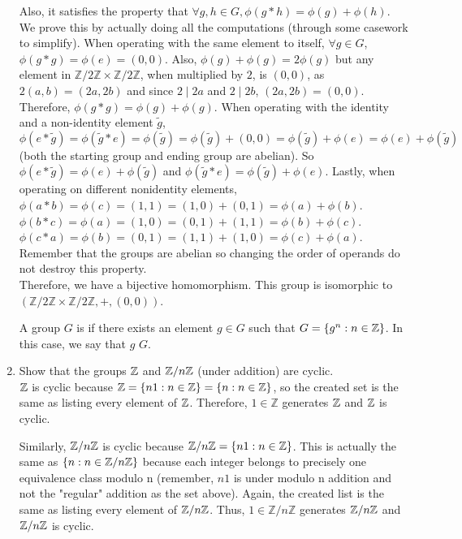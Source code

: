 \documentclass{amsart}
\begin{document}
\begin{enumerate}[itemsep=0.4in]
Also, it satisfies the property that $\forall g,h\in G,\phi(g*h)=\phi(g)+\phi(h)$. We prove this by actually doing all the computations (through some casework to simplify). 
When operating with the same element to itself, $\forall g\in G$, $\phi(g*g)=\phi(e)=(0,0)$. Also, $\phi(g)+\phi(g)=2\phi(g)$ but any element in $\mathbb{Z}/2\mathbb{Z}\times\mathbb{Z}/2\mathbb{Z}$, when multiplied by $2$, is $(0,0)$, as $2(a,b)=(2a,2b)$ and since $2\mid 2a$ and $2\mid 2b$, $(2a,2b)=(0,0)$. Therefore, $\phi(g*g)=\phi(g)+\phi(g)$. 
When operating with the identity and a non-identity element $\tilde g$, $$\phi(e*\tilde g)=\phi(\tilde g*e)=\phi(\tilde g)=\phi(\tilde g)+(0,0)=\phi(\tilde g)+\phi(e)=\phi(e)+\phi(\tilde g)$$ (both the starting group and ending group are abelian). So $\phi(e*\tilde g)=\phi(e)+\phi(\tilde g)$ and $\phi(\tilde{g}*e)=\phi(\tilde g)+\phi(e)$.
Lastly, when operating on different nonidentity elements, $\phi(a*b)=\phi(c)=(1,1)=(1,0)+(0,1)=\phi(a)+\phi(b)$. $\phi(b*c)=\phi(a)=(1,0)=(0,1)+(1,1)=\phi(b)+\phi(c)$. $\phi(c*a)=\phi(b)=(0,1)=(1,1)+(1,0)=\phi(c)+\phi(a)$. Remember that the groups are abelian so changing the order of operands do not destroy this property.\\

Therefore, we have a bijective homomorphism. This group is isomorphic to $(\mathbb{Z}/2\mathbb{Z}\times\mathbb{Z}/2\mathbb{Z},+,(0,0))$.\\


\vspace{0.2in}

A group $G$ is  if there exists an element $g\in G$ such that $G = \{g^n:n\in \mathbb{Z}\}$. In this case, we say that $g$  $G$.

\item Show that the groups $\mathbb{Z}$ and $\mathbb{Z}/n\mathbb{Z}$ (under addition) are cyclic.\\

$\mathbb{Z}$ is cyclic because $\mathbb{Z}=\{n1:n\in\mathbb{Z}\}=\{n:n\in\mathbb{Z}\}$, so the created set is the same as listing every element of $\mathbb{Z}$. Therefore, $1\in\mathbb{Z}$ generates $\mathbb{Z}$ and $\mathbb{Z}$ is cyclic. 

Similarly, $\mathbb{Z}/n\mathbb{Z}$ is cyclic because $\mathbb{Z}/n\mathbb{Z}=\{n1:n\in\mathbb{Z}\}$. This is actually the same as $\{n:n\in\mathbb{Z}/n\mathbb{Z}\}$ because each integer belongs to precisely one equivalence class modulo n (remember, $n1$ is under modulo n addition and not the "regular" addition as the set above). Again, the created list is the same as listing every element of $\mathbb{Z}/n\mathbb{Z}$. Thus, $1\in\mathbb{Z}/n\mathbb{Z}$ generates $\mathbb{Z}/n\mathbb{Z}$ and $\mathbb{Z}/n\mathbb{Z}$ is cyclic.


\end{enumerate}
\end{document}
